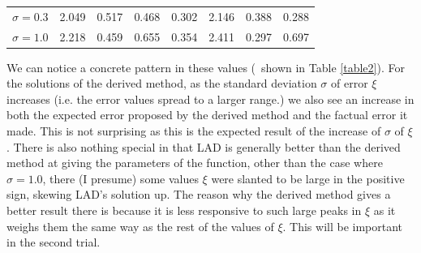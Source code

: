 \begin{table}[h!]
\begin{tabular}{|c|r|r|r|r|r|r|r|}
$\sigma = 0.3$                                                                & 2.049                            & 0.517                            & 0.468                                                                         & 0.302                                                                        & 2.146                            & 0.388                            & 0.288                                                                        \\ \cline{1-1}
$\sigma = 1.0$                                                                & 2.218                            & 0.459                            & 0.655                                                                         & 0.354                                                                        & 2.411                            & 0.297                            & 0.697                                                                        \\ \hline
\end{tabular}
\egroup
\end{table}
We can notice a concrete pattern in these values (~shown in Table \vref{table2}). For the solutions of the derived method, as the standard deviation $\sigma$ of error $\xi$ increases (i.e. the error values spread to a larger range.) we also see an increase in both the expected error proposed by the derived method and the factual error it made. This is not surprising as this is the expected result of the increase of $\sigma$ of $\xi$. There is also nothing special in that LAD is generally better than the derived method at giving the parameters of the function, other than the case where $\sigma = 1.0$, there (I presume) some values $\xi$ were slanted to be large in the positive sign, skewing LAD's solution up. The reason why the derived method gives a better result there is because it is less responsive to such large peaks in $\xi$ as it weighs them the same way as the rest of the values of $\xi$. This will be important in the second trial.
